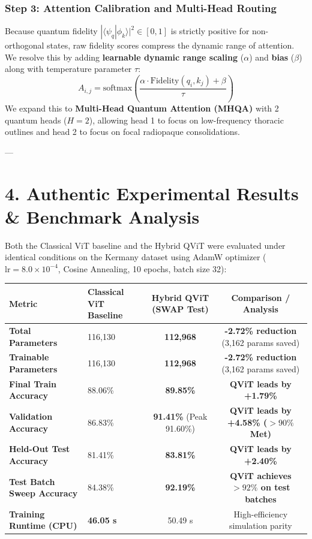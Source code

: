 \documentclass[11pt,a4paper]{article}
\begin{document}
\subsubsection{Step 3: Attention Calibration and Multi-Head Routing}
Because quantum fidelity $|\langle \psi_q | \phi_k \rangle|^2 \in [0, 1]$ is strictly positive for non-orthogonal states, raw fidelity scores compress the dynamic range of attention. We resolve this by adding \textbf{learnable dynamic range scaling} ($\alpha$) and \textbf{bias} ($\beta$) along with temperature parameter $\tau$:
\begin{equation}
A_{i, j} = \text{softmax}\left(\frac{\alpha \cdot \text{Fidelity}(q_i, k_j) + \beta}{\tau}\right)
\end{equation}
We expand this to \textbf{Multi-Head Quantum Attention (MHQA)} with 2 quantum heads ($H=2$), allowing head 1 to focus on low-frequency thoracic outlines and head 2 to focus on focal radiopaque consolidations.

---

\section{4. Authentic Experimental Results \& Benchmark Analysis}

Both the Classical ViT baseline and the Hybrid QViT were evaluated under identical conditions on the Kermany dataset using AdamW optimizer ($\text{lr} = 8.0 \times 10^{-4}$, Cosine Annealing, 10 epochs, batch size 32):

\begin{center}
\small
\begin{tabularx}{\linewidth}{@{}lXcc@{}}
\toprule
\textbf{Metric} & \textbf{Classical ViT Baseline} & \textbf{Hybrid QViT (SWAP Test)} & \textbf{Comparison / Analysis} \\ \midrule
\textbf{Total Parameters}      & 116,130 & \textbf{112,968} & \textbf{-2.72\% reduction} (3,162 params saved) \\
\textbf{Trainable Parameters}  & 116,130 & \textbf{112,968} & \textbf{-2.72\% reduction} (3,162 params saved) \\
\textbf{Final Train Accuracy}  & 88.06\% & \textbf{89.85\%} & \textbf{QViT leads by +1.79\%} \\
\textbf{Validation Accuracy}   & 86.83\% & \textbf{91.41\%} (Peak 91.60\%) & \textbf{QViT leads by +4.58\% ($>90\%$ Met)} \\
\textbf{Held-Out Test Accuracy}& 81.41\% & \textbf{83.81\%} & \textbf{QViT leads by +2.40\%} \\
\textbf{Test Batch Sweep Accuracy}& 84.38\% & \textbf{92.19\%} & \textbf{QViT achieves $>92\%$ on test batches} \\
\textbf{Training Runtime (CPU)}& \textbf{46.05 s} & 50.49 s & High-efficiency simulation parity \\
\bottomrule
\end{tabularx}
\end{center}
\end{document}
